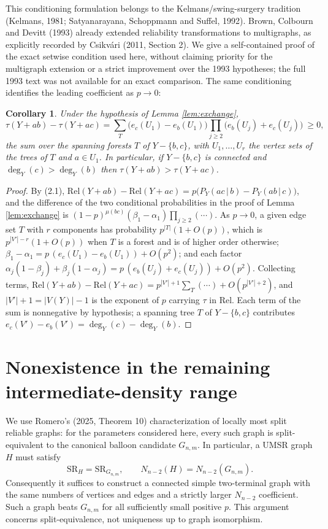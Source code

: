 \documentclass[
  11pt,
]{article}
\newcounter{none} %
\newtheorem{corollary}[theorem]{Corollary}
\theoremstyle{definition}
\theoremstyle{remark}
\begin{document}
This conditioning formulation belongs to the Kelmans/swing-surgery
tradition (Kelmans, 1981; Satyanarayana, Schoppmann and Suffel, 1992).
Brown, Colbourn and Devitt (1993) already extended reliability
transformations to multigraphs, as explicitly recorded by Csikvári
(2011, Section 2). We give a self-contained proof of the exact setwise
condition used here, without claiming priority for the multigraph
extension or a strict improvement over the 1993 hypotheses; the full
1993 text was not available for an exact comparison. The same
conditioning identifies the leading coefficient as \(p\to0\):

\begin{corollary}\label{cor:trees}
Under the hypothesis of Lemma \ref{lem:exchange},
$$\tau(Y+ab)-\tau(Y+ac)=\sum_{T}\big(e_c(U_1)-e_b(U_1)\big)\prod_{j\ge2}\big(e_b(U_j)+e_c(U_j)\big)\ \ge 0,$$
the sum over the spanning forests $T$ of $Y-\{b,c\}$, with $U_1,\dots,U_r$ the vertex sets of the trees of $T$ and $a\in U_1$. In particular, if $Y-\{b,c\}$ is connected and $\deg_Y(c)>\deg_Y(b)$ then $\tau(Y+ab)>\tau(Y+ac)$.
\end{corollary}

\begin{proof}
By (2.1), $\mathrm{Rel}(Y+ab)-\mathrm{Rel}(Y+ac)=p\big(P_Y(ac\,|\,b)-P_Y(ab\,|\,c)\big)$, and the difference of the two conditional probabilities in the proof of Lemma \ref{lem:exchange} is $(1-p)^{\mu(bc)}(\beta_1-\alpha_1)\prod_{j\ge2}(\cdots)$. As $p\to0$, a given edge set $T$ with $r$ components has probability $p^{|T|}(1+O(p))$, which is $p^{|V'|-r}(1+O(p))$ when $T$ is a forest and is of higher order otherwise; $\beta_1-\alpha_1=p\,(e_c(U_1)-e_b(U_1))+O(p^2)$; and each factor $\alpha_j(1-\beta_j)+\beta_j(1-\alpha_j)=p\,(e_b(U_j)+e_c(U_j))+O(p^2)$. Collecting terms, $\mathrm{Rel}(Y+ab)-\mathrm{Rel}(Y+ac)=p^{|V'|+1}\sum_T(\cdots)+O(p^{|V'|+2})$, and $|V'|+1=|V(Y)|-1$ is the exponent of $p$ carrying $\tau$ in $\mathrm{Rel}$. Each term of the sum is nonnegative by hypothesis; a spanning tree $T$ of $Y-\{b,c\}$ contributes $e_c(V')-e_b(V')=\deg_Y(c)-\deg_Y(b)$.
\end{proof}

\section{Nonexistence in the remaining intermediate-density
range}\label{nonexistence-in-the-remaining-intermediate-density-range}

We use Romero's (2025, Theorem 10) characterization of locally most
split reliable graphs: for the parameters considered here, every such
graph is split-equivalent to the canonical balloon candidate
\(G_{n,m}\). In particular, a UMSR graph \(H\) must satisfy
\[\mathrm{SR}_H=\mathrm{SR}_{G_{n,m}},\qquad N_{n-2}(H)=N_{n-2}(G_{n,m}).\]
Consequently it suffices to construct a connected simple two-terminal
graph with the same numbers of vertices and edges and a strictly larger
\(N_{n-2}\) coefficient. Such a graph beats \(G_{n,m}\) for all
sufficiently small positive \(p\). This argument concerns
split-equivalence, not uniqueness up to graph isomorphism.
\end{document}

